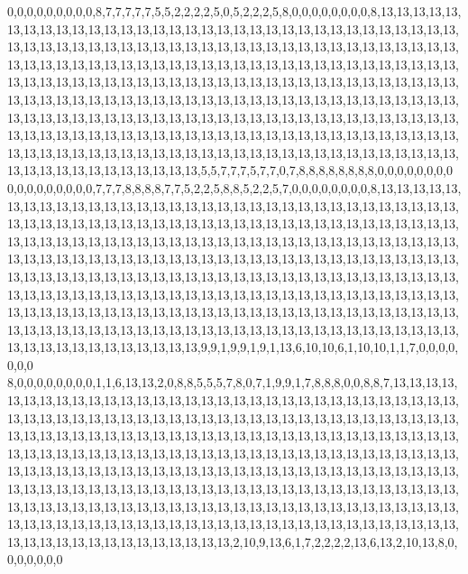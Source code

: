 0,0,0,0,0,0,0,0,0,8,7,7,7,7,7,5,5,2,2,2,2,5,0,5,2,2,2,5,8,0,0,0,0,0,0,0,0,8,13,13,13,13,13,13,13,13,13,13,13,13,13,13,13,13,13,13,13,13,13,13,13,13,13,13,13,13,13,13,13,13,13,13,13,13,13,13,13,13,13,13,13,13,13,13,13,13,13,13,13,13,13,13,13,13,13,13,13,13,13,13,13,13,13,13,13,13,13,13,13,13,13,13,13,13,13,13,13,13,13,13,13,13,13,13,13,13,13,13,13,13,13,13,13,13,13,13,13,13,13,13,13,13,13,13,13,13,13,13,13,13,13,13,13,13,13,13,13,13,13,13,13,13,13,13,13,13,13,13,13,13,13,13,13,13,13,13,13,13,13,13,13,13,13,13,13,13,13,13,13,13,13,13,13,13,13,13,13,13,13,13,13,13,13,13,13,13,13,13,13,13,13,13,13,13,13,13,13,13,13,13,13,13,13,13,13,13,13,13,13,13,13,13,13,13,13,13,13,13,13,13,13,13,13,13,13,13,13,13,13,13,13,13,13,13,13,13,13,13,13,13,13,13,13,13,13,13,13,13,13,13,13,13,13,13,13,13,13,13,13,5,5,7,7,7,5,7,7,0,7,8,8,8,8,8,8,8,8,0,0,0,0,0,0,0,0
0,0,0,0,0,0,0,0,0,7,7,7,8,8,8,8,7,7,5,2,2,5,8,8,5,2,2,5,7,0,0,0,0,0,0,0,0,8,13,13,13,13,13,13,13,13,13,13,13,13,13,13,13,13,13,13,13,13,13,13,13,13,13,13,13,13,13,13,13,13,13,13,13,13,13,13,13,13,13,13,13,13,13,13,13,13,13,13,13,13,13,13,13,13,13,13,13,13,13,13,13,13,13,13,13,13,13,13,13,13,13,13,13,13,13,13,13,13,13,13,13,13,13,13,13,13,13,13,13,13,13,13,13,13,13,13,13,13,13,13,13,13,13,13,13,13,13,13,13,13,13,13,13,13,13,13,13,13,13,13,13,13,13,13,13,13,13,13,13,13,13,13,13,13,13,13,13,13,13,13,13,13,13,13,13,13,13,13,13,13,13,13,13,13,13,13,13,13,13,13,13,13,13,13,13,13,13,13,13,13,13,13,13,13,13,13,13,13,13,13,13,13,13,13,13,13,13,13,13,13,13,13,13,13,13,13,13,13,13,13,13,13,13,13,13,13,13,13,13,13,13,13,13,13,13,13,13,13,13,13,13,13,13,13,13,13,13,13,13,13,13,13,13,13,13,13,13,13,13,9,9,1,9,9,1,9,1,13,6,10,10,6,1,10,10,1,1,7,0,0,0,0,0,0,0
8,0,0,0,0,0,0,0,0,1,1,6,13,13,2,0,8,8,5,5,5,7,8,0,7,1,9,9,1,7,8,8,8,0,0,8,8,7,13,13,13,13,13,13,13,13,13,13,13,13,13,13,13,13,13,13,13,13,13,13,13,13,13,13,13,13,13,13,13,13,13,13,13,13,13,13,13,13,13,13,13,13,13,13,13,13,13,13,13,13,13,13,13,13,13,13,13,13,13,13,13,13,13,13,13,13,13,13,13,13,13,13,13,13,13,13,13,13,13,13,13,13,13,13,13,13,13,13,13,13,13,13,13,13,13,13,13,13,13,13,13,13,13,13,13,13,13,13,13,13,13,13,13,13,13,13,13,13,13,13,13,13,13,13,13,13,13,13,13,13,13,13,13,13,13,13,13,13,13,13,13,13,13,13,13,13,13,13,13,13,13,13,13,13,13,13,13,13,13,13,13,13,13,13,13,13,13,13,13,13,13,13,13,13,13,13,13,13,13,13,13,13,13,13,13,13,13,13,13,13,13,13,13,13,13,13,13,13,13,13,13,13,13,13,13,13,13,13,13,13,13,13,13,13,13,13,13,13,13,13,13,13,13,13,13,13,13,13,13,13,13,13,13,13,13,13,13,13,13,13,2,10,9,13,6,1,7,2,2,2,2,13,6,13,2,10,13,8,0,0,0,0,0,0,0
